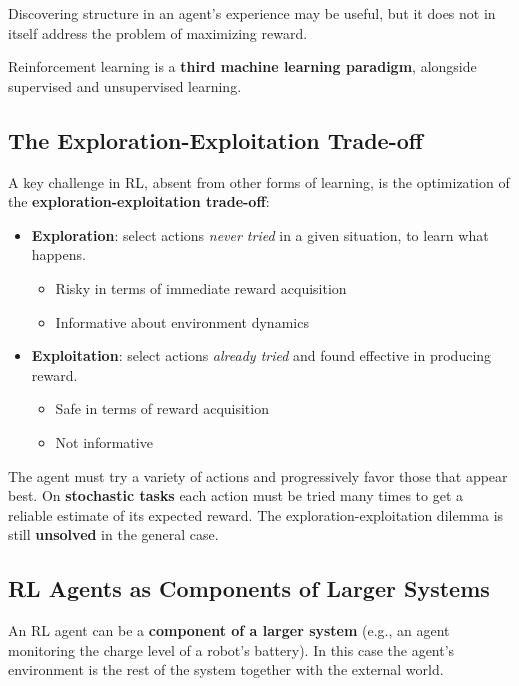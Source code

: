 \documentclass[11pt,a4paper]{article}
\theoremstyle{definition}
\theoremstyle{plain}
\theoremstyle{remark}
\begin{document}
Discovering structure in an agent's experience may be useful, but it does not in itself address the problem of maximizing reward.

\begin{tcolorbox}[colback=green!5!white,colframe=green!75!black]
\centering
Reinforcement learning is a \textbf{third machine learning paradigm}, alongside supervised and unsupervised learning.
\end{tcolorbox}

\subsection{The Exploration-Exploitation Trade-off}

A key challenge in RL, absent from other forms of learning, is the optimization of the \textbf{exploration-exploitation trade-off}:

\begin{itemize}
    \item \textbf{Exploration}: select actions \textit{never tried} in a given situation, to learn what happens.
    \begin{itemize}
        \item Risky in terms of immediate reward acquisition
        \item Informative about environment dynamics
    \end{itemize}
    \item \textbf{Exploitation}: select actions \textit{already tried} and found effective in producing reward.
    \begin{itemize}
        \item Safe in terms of reward acquisition
        \item Not informative
    \end{itemize}
\end{itemize}

The agent must try a variety of actions and progressively favor those that appear best. On \textbf{stochastic tasks} each action must be tried many times to get a reliable estimate of its expected reward. The exploration-exploitation dilemma is still \textbf{unsolved} in the general case.

\subsection{RL Agents as Components of Larger Systems}

An RL agent can be a \textbf{component of a larger system} (e.g., an agent monitoring the charge level of a robot's battery). In this case the agent's environment is the rest of the system together with the external world.
\end{document}
